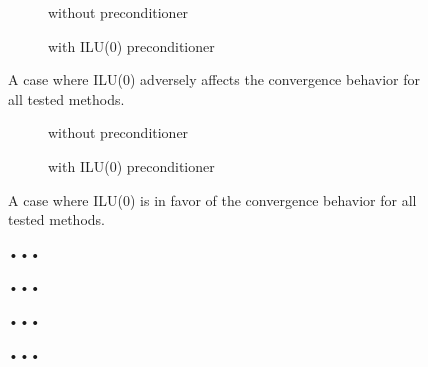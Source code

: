 \documentclass{scrartcl}
\numberwithin{equation}{section}
\begin{document}
\begin{figure}
\centering
\begin{subfigure}{.5\textwidth}
  \centering
  \resizebox{.9\textwidth}{!}{}
  \caption{without preconditioner}
  \label{fig:xenon2_scale}
\end{subfigure}%
\begin{subfigure}{.5\textwidth}
  \centering
  \resizebox{.9\textwidth}{!}{}
  \caption{with ILU(0) preconditioner}
  \label{fig:xenon2_ilu0}
\end{subfigure}
\caption{A case where ILU(0) adversely affects the convergence behavior for all tested methods.}
\label{fig:xenon}
\end{figure}

\begin{figure}
\centering
\begin{subfigure}{.5\textwidth}
  \centering
  \resizebox{.9\textwidth}{!}{}
  \caption{without preconditioner}
  \label{fig:sherman3_unscaled}
\end{subfigure}%
\begin{subfigure}{.5\textwidth}
  \centering
  \resizebox{.9\textwidth}{!}{}
  \caption{with ILU(0) preconditioner}
  \label{fig:sherman3_ilu0}
\end{subfigure}
\caption{A case where ILU(0) is in favor of the convergence behavior for all tested methods.}
\label{fig:test}
\end{figure}



\begin{figure}
	\centering
	\resizebox{.9\textwidth}{!}{}
	\caption{•••}
	\label{fig:bcsstk18_noscale}
\end{figure}
\begin{figure}
	\centering
	\resizebox{.9\textwidth}{!}{}
	\caption{•••}
	\label{fig:bcsstk18_scale}
\end{figure}
\begin{figure}
	\centering
	\resizebox{.9\textwidth}{!}{}
	\caption{•••}
	\label{fig:pwtk_noscale}
\end{figure}
\begin{figure}
	\centering
	\resizebox{.9\textwidth}{!}{}
	\caption{•••}
	\label{fig:pwtk_scale}
\end{figure}
\end{document}
